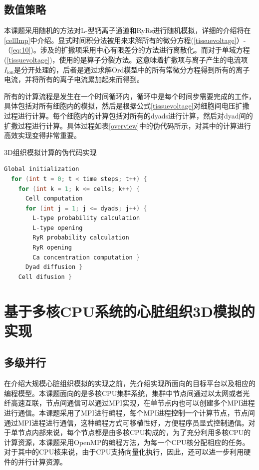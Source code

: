 \subsection{数值策略}
本课题采用随机的方法对L-型钙离子通道和RyRs进行随机模拟，详细的介绍将在\ref{cellImp}中介绍。显式时间积分法被用来求解所有的微分方程(\ref{tissuevoltage}）-（\ref{eq:10})。涉及的扩撒项采用中心有限差分的方法进行离散化。而对于单域方程(\ref{tissuevoltage})，使用的是算子分裂方法。这意味着扩撒项与离子产生的电流项$I_\mathrm{ion}$是分开处理的，后者是通过求解Ord模型中的所有常微分方程得到所有的离子电流，并将所有的离子电流累加起来而得到。

所有的计算流程是发生在一个时间循环内，循环中是每个时间步需要完成的工作，具体包括对所有细胞内的模拟，然后是根据公式\ref{tissuevoltage}对细胞间电压扩撒过程进行计算。每个细胞内的计算包括对所有的dyads进行计算，然后对dyad间的扩撒过程进行计算。具体过程如表\ref{overview}中的伪代码所示，对其中的计算进行高效实现变得非常重要。

\begin{table}
\caption{3D组织模拟计算的伪代码实现}
\label{overview}
\begin{lstlisting}[language=C++, basicstyle=\ttfamily\footnotesize]
Global initialization
  for (int t = 0; t < time steps; t++) {	
    for (int k = 1; k <= cells; k++) {
      Cell computation
      for (int j = 1; j <= dyads; j++) {
        L-type probability calculation
        L-type opening	
        RyR probability calculation
        RyR opening
        Ca concentration computation }
      Dyad diffusion }
    Cell difusion }
\end{lstlisting}
\end{table}

\section{基于多核CPU系统的心脏组织3D模拟的实现}

 \subsection{多级并行}

在介绍大规模心脏组织模拟的实现之前，先介绍实现所面向的目标平台以及相应的编程模型。本课题面向的是多核CPU集群系统，集群中节点间通过以太网或者光纤高速互联，节点间通信可以通过MPI实现，在单节点内也可以创建多个MPI进程进行通信。本课题采用了MPI进行编程，每个MPI进程控制一个计算节点，节点间通过MPI进程进行通信，这种编程方式可移植性好，方便程序员显式控制通信。对于单节点内部来说，每个节点都是由多核CPU构成的，为了充分利用多核CPU的计算资源，本课题采用OpenMP的编程方法，为每一个CPU核分配相应的任务。对于其中的CPU核来说，由于CPU支持向量化执行，因此，还可以进一步利用硬件的并行计算资源。

